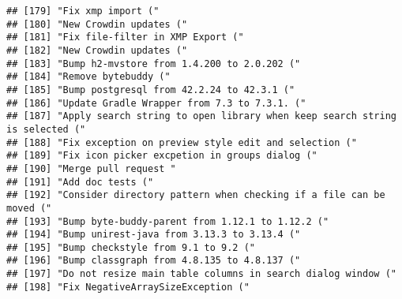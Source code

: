 \documentclass[
]{article}
\begin{document}
\begin{verbatim}
## [179] "Fix xmp import ("                                                                                                           
## [180] "New Crowdin updates ("                                                                                                      
## [181] "Fix file-filter in XMP Export ("                                                                                            
## [182] "New Crowdin updates ("                                                                                                      
## [183] "Bump h2-mvstore from 1.4.200 to 2.0.202 ("                                                                                  
## [184] "Remove bytebuddy ("                                                                                                         
## [185] "Bump postgresql from 42.2.24 to 42.3.1 ("                                                                                   
## [186] "Update Gradle Wrapper from 7.3 to 7.3.1. ("                                                                                 
## [187] "Apply search string to open library when keep search string is selected ("                                                  
## [188] "Fix exception on preview style edit and selection ("                                                                        
## [189] "Fix icon picker excpetion in groups dialog ("                                                                               
## [190] "Merge pull request "                                                                                                        
## [191] "Add doc tests ("                                                                                                            
## [192] "Consider directory pattern when checking if a file can be moved ("                                                          
## [193] "Bump byte-buddy-parent from 1.12.1 to 1.12.2 ("                                                                             
## [194] "Bump unirest-java from 3.13.3 to 3.13.4 ("                                                                                  
## [195] "Bump checkstyle from 9.1 to 9.2 ("                                                                                          
## [196] "Bump classgraph from 4.8.135 to 4.8.137 ("                                                                                  
## [197] "Do not resize main table columns in search dialog window ("                                                                 
## [198] "Fix NegativeArraySizeException ("                                                                                           

\end{verbatim}
\end{document}
